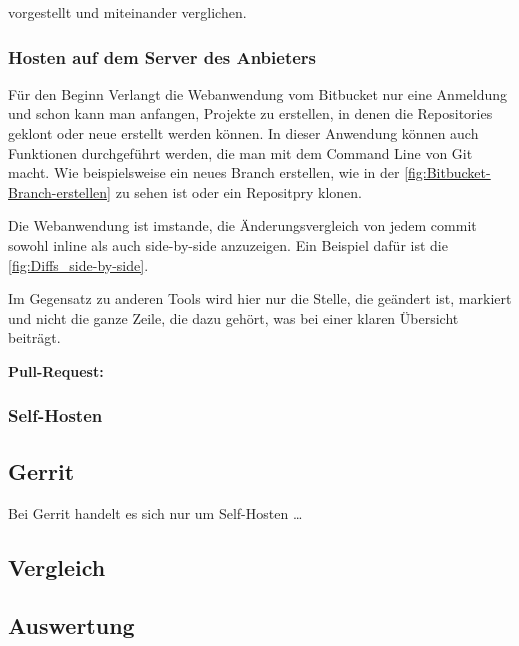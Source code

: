 vorgestellt und miteinander verglichen.

\subsubsection{Hosten auf dem Server des Anbieters}
\label{subsubsec:Bitbucket-Cloud}

Für den Beginn Verlangt die Webanwendung vom Bitbucket nur eine Anmeldung und schon kann man anfangen, Projekte zu erstellen, in denen die Repositories geklont oder neue erstellt werden können. In dieser Anwendung können auch Funktionen durchgeführt werden, die man mit dem Command Line von Git macht. Wie beispielsweise ein neues Branch erstellen, wie in der \cref{fig:Bitbucket-Branch-erstellen} zu sehen ist oder ein Repositpry klonen.


Die Webanwendung ist imstande, die Änderungsvergleich von jedem commit sowohl inline als auch side-by-side anzuzeigen. Ein Beispiel dafür ist die \cref{fig:Diffs_side-by-side}.


Im Gegensatz zu anderen Tools wird hier nur die Stelle, die geändert ist, markiert und nicht die ganze Zeile, die dazu gehört, was bei einer klaren Übersicht beiträgt.

\textbf{Pull-Request:} 

\subsubsection{Self-Hosten}
\label{subsubsec:Bitbucket-self-host} 

\subsection{Gerrit}
\label{subsubsec:Test_Gerrit}

Bei Gerrit handelt es sich nur um Self-Hosten \dots

\subsection{Vergleich}
\label{subsec:Vergleich_Bitbucket_Gerrit}


\subsection{Auswertung}
\label{subsec:Auswertung}

